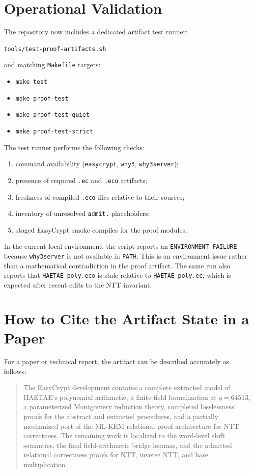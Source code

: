 \documentclass[11pt]{article}
\newcommand{\file}[1]{\texttt{#1}}
\newcommand{\ec}[1]{\texttt{#1}}
\newcommand{\todoec}{\textcolor{red!60!black}{\texttt{admit.}}}
\begin{document}
\section{Operational Validation}

The repository now includes a dedicated artifact test runner:
\begin{center}
\file{tools/test-proof-artifacts.sh}
\end{center}
and matching \file{Makefile} targets:
\begin{itemize}[leftmargin=1.5em]
\item \ec{make test}
\item \ec{make proof-test}
\item \ec{make proof-test-quiet}
\item \ec{make proof-test-strict}
\end{itemize}

The test runner performs the following checks:
\begin{enumerate}[leftmargin=1.5em]
\item command availability (\ec{easycrypt}, \ec{why3}, \ec{why3server});
\item presence of required \file{.ec} and \file{.eco} artifacts;
\item freshness of compiled \file{.eco} files relative to their sources;
\item inventory of unresolved \todoec{} placeholders;
\item staged EasyCrypt smoke compiles for the proof modules.
\end{enumerate}

In the current local environment, the script reports an
\ec{ENVIRONMENT\_FAILURE} because \ec{why3server} is not available in
\ec{PATH}. This is an environment issue rather than a mathematical contradiction
in the proof artifact. The same run also reports that
\file{HAETAE\_poly.eco} is stale relative to \file{HAETAE\_poly.ec}, which is
expected after recent edits to the NTT invariant.

\section{How to Cite the Artifact State in a Paper}

For a paper or technical report, the artifact can be described accurately as
follows:
\begin{quote}
The EasyCrypt development contains a complete extracted model of HAETAE's
polynomial arithmetic, a finite-field formalization at $q = 64513$, a
parameterized Montgomery reduction theory, completed losslessness proofs for the
abstract and extracted procedures, and a partially mechanized port of the
ML-KEM relational proof architecture for NTT correctness. The remaining work is
localized to the word-level shift semantics, the final field-arithmetic bridge
lemmas, and the admitted relational correctness proofs for NTT, inverse NTT,
and base multiplication.
\end{quote}
\end{document}
